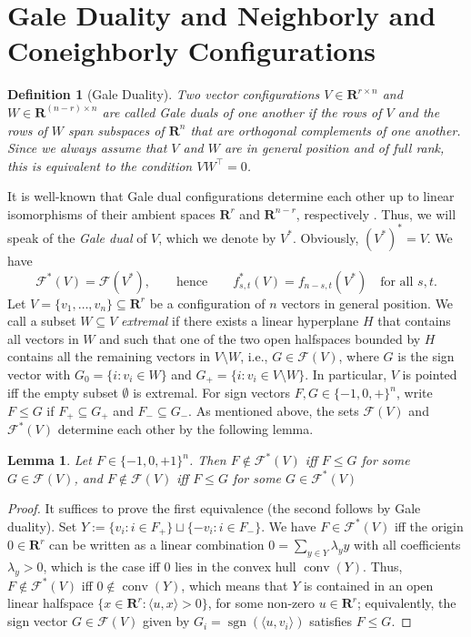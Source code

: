 \documentclass[11pt]{article}
\newtheorem{lemma}[theorem]{Lemma}
\newtheorem{definition}[theorem]{Definition}
\DeclareMathOperator{\sgn}{sgn}
\DeclareMathOperator{\conv}{conv}
\renewcommand{\leq}{\leqslant}
\newcommand{\R}{\mathbf{R}}
\begin{document}
\section{Gale Duality and Neighborly and Coneighborly Configurations}
\label{sec:Gale}
%
\begin{definition}[Gale Duality] 
\label{def:Gale}
Two vector configurations $V \in \R^{r\times n}$ and $W\in \R^{(n-r)\times n}$ are called \emph{Gale duals} of one another if the rows of $V$ and the rows of $W$ span subspaces of $\R^n$ that are orthogonal complements of one another. Since we always assume that $V$ and $W$ are in general position and of full rank, this is equivalent to the condition $VW^{\top} = 0$.
\end{definition}
%
It is well-known  that 
Gale dual configurations determine each other up to linear isomorphisms of their ambient spaces $\R^r$ and $\R^{n-r}$, respectively \cite[Sec.~5.6]{Matousek:2002aa}. Thus, we will speak of the \emph{Gale dual} of $V$, which we denote by $V^*$. Obviously, $(V^*)^*=V$.
We have 
\[\mathcal{F}^{*}(V)=\mathcal{F}(V^*),\qquad \textrm{hence} \qquad f^*_{s,t}(V)=f_{n-s,t}(V^*)\quad \textrm{for all }s,t.\]
%
%
Let $V=\{v_1,\dots,v_n\}\subseteq \R^r$ be a configuration of $n$ vectors in general position. We call a subset $W\subseteq V$ \emph{extremal} if there exists a linear hyperplane $H$ that contains all vectors in $W$ and such that one of the two open halfspaces bounded by $H$ contains all the remaining vectors in $V\setminus W$, i.e., $G\in \mathcal{F}(V)$, where $G$ is the sign vector with $G_0=\{i\colon v_i \in W\}$ and $G_+=\{i\colon v_i \in V\setminus W\}$. In particular, $V$ is pointed iff the empty subset $\emptyset$ is extremal.
%
For sign vectors $F,G \in \{-1,0,+\}^n$, write $F\leq G$ if $F_+ \subseteq G_+$ and $F_- \subseteq G_-$. As mentioned above, the sets $\mathcal{F}(V)$ and $\mathcal{F}^*(V)$ determine each other by the following lemma. 
\begin{lemma}
\label{lem:Farkas}
Let $F\in \{-1,0,+1\}^n$. Then $F\not\in \mathcal{F}^*(V)$ iff $F\leq G$ for some $G\in \mathcal{F}(V)$, and $F\not\in \mathcal{F}(V)$ iff $F\leq G$ for some $G\in \mathcal{F}^*(V)$
\end{lemma}
\begin{proof}
It suffices to prove the first equivalence (the second follows by Gale duality). Set $Y:=\{v_i \colon i\in F_+\} \sqcup \{-v_i \colon i\in F_-\}$. We have $F\in \mathcal{F}^*(V)$ iff the origin $0\in \R^r$ can be written as a linear combination 
$0=\sum_{y \in Y} \lambda_y y$ with all coefficients $\lambda_y>0$, which is the case iff $0$ lies in the convex hull $\conv(Y)$. Thus, $F\not\in \mathcal{F}^*(V)$ iff $0\not\in \conv(Y)$, which means that $Y$ is contained in an open linear halfspace $\{x\in \R^r\colon \langle u,x\rangle >0\}$, for some non-zero $u\in \R^r$; equivalently, the sign vector $G\in \mathcal{F}(V)$ given by $G_i =\sgn(\langle u,v_i\rangle)$ satisfies $F\leq G$.
\end{proof}
\end{document}
